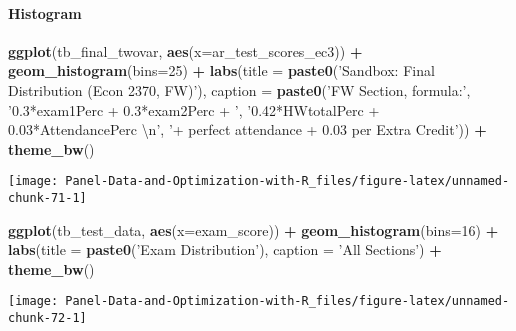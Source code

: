 \documentclass[
]{book}
\newenvironment{Shaded}{\begin{snugshade}}{\end{snugshade}}
\newcommand{\CharTok}[1]{\textcolor[rgb]{0.31,0.60,0.02}{#1}}
\newcommand{\DataTypeTok}[1]{\textcolor[rgb]{0.13,0.29,0.53}{#1}}
\newcommand{\DecValTok}[1]{\textcolor[rgb]{0.00,0.00,0.81}{#1}}
\newcommand{\KeywordTok}[1]{\textcolor[rgb]{0.13,0.29,0.53}{\textbf{#1}}}
\newcommand{\NormalTok}[1]{#1}
\newcommand{\OperatorTok}[1]{\textcolor[rgb]{0.81,0.36,0.00}{\textbf{#1}}}
\newcommand{\StringTok}[1]{\textcolor[rgb]{0.31,0.60,0.02}{#1}}
\begin{document}
\hypertarget{histogram-1}{%
\paragraph{Histogram}\label{histogram-1}}

\begin{Shaded}
\begin{Highlighting}[]
\KeywordTok{ggplot}\NormalTok{(tb_final_twovar, }\KeywordTok{aes}\NormalTok{(}\DataTypeTok{x=}\NormalTok{ar_test_scores_ec3)) }\OperatorTok{+}
\StringTok{  }\KeywordTok{geom_histogram}\NormalTok{(}\DataTypeTok{bins=}\DecValTok{25}\NormalTok{) }\OperatorTok{+}
\StringTok{  }\KeywordTok{labs}\NormalTok{(}\DataTypeTok{title =} \KeywordTok{paste0}\NormalTok{(}\StringTok{'Sandbox: Final Distribution (Econ 2370, FW)'}\NormalTok{),}
       \DataTypeTok{caption =} \KeywordTok{paste0}\NormalTok{(}\StringTok{'FW Section, formula:'}\NormalTok{,}
                        \StringTok{'0.3*exam1Perc + 0.3*exam2Perc + '}\NormalTok{,}
                        \StringTok{'0.42*HWtotalPerc + 0.03*AttendancePerc }\CharTok{\textbackslash{}n}\StringTok{'}\NormalTok{,}
                        \StringTok{'+ perfect attendance + 0.03 per Extra Credit'}\NormalTok{)) }\OperatorTok{+}
\StringTok{  }\KeywordTok{theme_bw}\NormalTok{()}
\end{Highlighting}
\end{Shaded}

\begin{center}\texttt{[image: Panel-Data-and-Optimization-with-R\_files/figure-latex/unnamed-chunk-71-1]} \end{center}

\begin{Shaded}
\begin{Highlighting}[]
\KeywordTok{ggplot}\NormalTok{(tb_test_data, }\KeywordTok{aes}\NormalTok{(}\DataTypeTok{x=}\NormalTok{exam_score)) }\OperatorTok{+}
\StringTok{  }\KeywordTok{geom_histogram}\NormalTok{(}\DataTypeTok{bins=}\DecValTok{16}\NormalTok{) }\OperatorTok{+}
\StringTok{  }\KeywordTok{labs}\NormalTok{(}\DataTypeTok{title =} \KeywordTok{paste0}\NormalTok{(}\StringTok{'Exam Distribution'}\NormalTok{),}
       \DataTypeTok{caption =} \StringTok{'All Sections'}\NormalTok{) }\OperatorTok{+}
\StringTok{  }\KeywordTok{theme_bw}\NormalTok{()}
\end{Highlighting}
\end{Shaded}

\begin{center}\texttt{[image: Panel-Data-and-Optimization-with-R\_files/figure-latex/unnamed-chunk-72-1]} \end{center}
\end{document}
